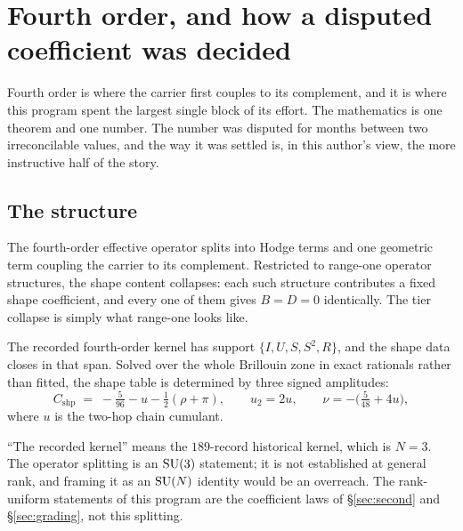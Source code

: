 \section{Fourth order, and how a disputed coefficient was decided}
\label{sec:fourth}

Fourth order is where the carrier first couples to its complement, and
it is where this program spent the largest single block of its effort.
The mathematics is one theorem and one number. The number was disputed
for months between two irreconcilable values, and the way it was settled
is, in this author's view, the more instructive half of the story.

\subsection{The structure}

The fourth-order effective operator splits into Hodge terms and one
geometric term coupling the carrier to its complement. Restricted to
range-one operator structures, the shape content collapses: each such
structure contributes a fixed shape coefficient, and every one of them
gives $B = D = 0$ identically. The tier collapse is simply what
range-one looks like.

\begin{theorem}
\label{thm:tiercollapse}
The recorded fourth-order kernel has support
$\{I, U, S, S^2, R\}$, and the shape data closes in that span. Solved
over the whole Brillouin zone in exact rationals rather than fitted, the
shape table is determined by three signed amplitudes:
\begin{equation}
  C_{\mathrm{shp}} \;=\; -\tfrac{5}{96} - u - \tfrac12(\rho + \pi),
  \qquad
  u_2 = 2u, \qquad \nu = -\big(\tfrac{5}{48} + 4u\big),
  \label{eq:kernelform}
\end{equation}
where $u$ is the two-hop chain cumulant.
\end{theorem}

\begin{scopenote}
``The recorded kernel'' means the $189$-record historical kernel, which
is $N = 3$. The operator splitting is an $\mathrm{SU}(3)$ statement; it is not
established at general rank, and framing it as an $\mathrm{SU}(N)$ identity
would be an overreach. The rank-uniform statements of this program are
the coefficient laws of \S\ref{sec:second} and \S\ref{sec:grading}, not
this splitting.
\end{scopenote}

